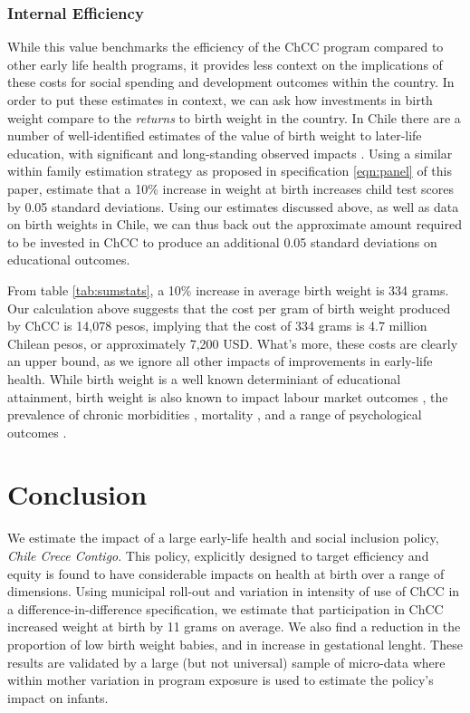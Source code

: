 \documentclass[12pt]{article}
\begin{document}
\begin{spacing}{1.4}
\subsubsection{Internal Efficiency}
While this value benchmarks the efficiency of the ChCC program compared to
other early life health programs, it provides less context on the implications
of these costs for social spending and development outcomes within the country.
In order to put these estimates in context, we can ask how investments in birth
weight compare to the \emph{returns} to birth weight in the country.  In Chile
there are a number of well-identified estimates of the value of birth weight to
later-life education, with significant and long-standing observed impacts
\citet{Bharadwajetal2013,Bharadwajetal2017}.  Using a similar within family
estimation strategy as proposed in specification \ref{eqn:panel} of this
paper, \citet{Bharadwajetal2017} estimate that a 10\% increase in weight at
birth increases child test scores by 0.05 standard deviations.  Using our
estimates discussed above, as well as data on birth weights in Chile, we can
thus back out the approximate amount required to be invested in ChCC to produce
an additional 0.05 standard deviations on educational outcomes.

From table \ref{tab:sumstats}, a 10\% increase in average birth weight is
334 grams.  Our calculation above suggests that the cost per gram of birth
weight produced by ChCC is 14,078 pesos, implying that the cost of 334 grams
is 4.7 million Chilean pesos, or approximately 7,200 USD.  What's more, these
costs are clearly an upper bound, as we ignore all other impacts of
improvements in early-life health.  While birth weight is a well known
determiniant of educational attainment, birth weight is also known to impact
labour market outcomes \citep{JohnsonSchoeni2011,CookFletcher2015,
  BehrmanRosenzweig2004,RosenzweigZhang2013,Caseetal2005}, the prevalence of
chronic morbidities \citep{Barker1995,AlmondMazumder2005,JohnsonSchoeni2011b},
mortality \citep{vandenBergetal2006}, and a range of psychological outcomes
\citep{Fletcher2011}.

\section{Conclusion} 
We estimate the impact of a large early-life health and social inclusion
policy, \emph{Chile Crece Contigo}.  This policy, explicitly designed to
target efficiency and equity is found to have considerable impacts on
health at birth over a range of dimensions.  Using municipal roll-out
and variation in intensity of use of ChCC in a difference-in-difference
specification, we estimate that participation in ChCC increased weight
at birth by 11 grams on average.  We also find a reduction in the proportion
of low birth weight babies, and in increase in gestational lenght.  These
results are validated by a large (but not universal) sample of micro-data
where within mother variation in program exposure is used to estimate the
policy's impact on infants.


\end{spacing}
\end{document}
